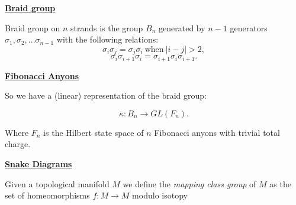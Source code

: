 \documentclass[12pt,a4paper]{article}
\begin{document}
\maketitle

\def\Complex {C}
\def\tensor{\otimes}
\def\Tensor{\bigotimes}
\def\bra #1{\langle #1|}
\def\ket #1{|#1\rangle}
\def\braket #1#2{\langle #1|#2 \rangle}



\def\mathZ{\mathbb{Z}}
\def\mathR{\mathbb{R}}


\def\heading #1{\vskip 20pt \noindent\underline{\bf #1}\vskip 5pt}


%

\heading{Braid group}

Braid group on $n$ strands is the group $B_n$ generated by $n-1$ generators
$\sigma_1, \sigma_2, ... \sigma_{n-1}$ with the following relations:
    $$ \sigma_i \sigma_j = \sigma_j \sigma_i \ \text{when}\ |i-j| > 2, $$
    $$ \sigma_i \sigma_{i+1} \sigma_i =  \sigma_{i+1} \sigma_i \sigma_{i+1}.$$



\heading{Fibonacci Anyons}


So we have a (linear) representation of the braid group:

    $$ \kappa : B_n \to GL(F_n).$$

Where $F_n$ is the Hilbert state space of $n$ Fibonacci anyons with
trivial total charge.



\heading{Snake Diagrams}


%

Given a topological manifold $M$ we define the {\it mapping class group} of $M$ as
the set of homeomorphisms $f:M\to M$ modulo isotopy
\end{document}
